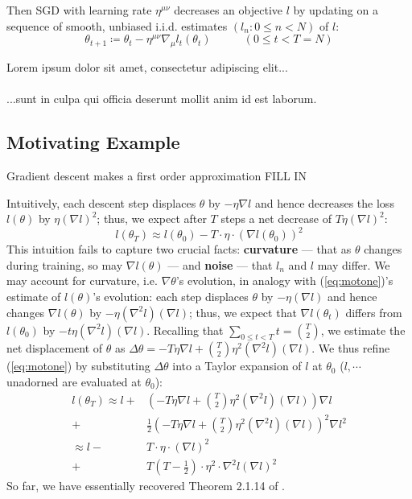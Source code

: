 \documentclass{article}
\newcommand{\wrap}[1]{\left( #1 \right)}
\newcommand{\lorem}[1]{
    Lorem ipsum dolor sit amet, consectetur adipiscing elit...\\
    \nopagebreak\vspace{#1cm} \ \\
    ...sunt in culpa qui officia deserunt mollit anim id est laborum.
}
\begin{document}
    Then SGD with learning rate $\eta^{\mu\nu}$ decreases an objective $l$ by
    updating on a sequence of smooth, unbiased i.i.d.  estimates $(l_n: 0\leq
    n<N)$ of $l$:
    \begin{equation}\label{eq:sgdstep} \theta_{t+1} \coloneqq \theta_t -
        \eta^{\mu\nu} \nabla_\mu l_t(\theta_t)~~~~~~~~~~~~~(0\leq t<T=N)
    \end{equation}

    \lorem{5}

\subsection*{Motivating Example}
    Gradient descent makes a first order approximation
    {\color{red} FILL IN}

    Intuitively, each descent step displaces $\theta$ by $-\eta \nabla l$ and
    hence decreases the loss $l(\theta)$ by $\eta (\nabla l)^2$; thus, we
    expect after $T$ steps a net decrease of $T \eta (\nabla l)^2$:
    \begin{equation} \label{eq:motone}
        l(\theta_T) \approx l(\theta_0) - T \cdot \eta \cdot (\nabla l(\theta_0))^2
    \end{equation}
    This intuition fails to capture two crucial facts: {\bf curvature} --- that
    as $\theta$ changes during training, so may $\nabla l(\theta)$ --- and {\bf
    noise} --- that $l_n$ and $l$ may differ.
    We may account for curvature, i.e. $\nabla \theta$'s evolution, in analogy
    with (\ref{eq:motone})'s estimate of $l(\theta)$'s evolution: each step
    displaces $\theta$ by $-\eta(\nabla l)$ and hence changes $\nabla
    l(\theta)$ by $-\eta (\nabla^2 l) (\nabla l)$; thus, we expect that $\nabla
    l(\theta_t)$ differs from $l(\theta_0)$ by $-t \eta (\nabla^2 l) (\nabla
    l)$.  Recalling that $\sum_{0\leq t<T} t = {T \choose 2}$, we estimate the
    net displacement of $\theta$ as $\Delta \theta = -T \eta \nabla l + {T
    \choose 2} \eta^2 (\nabla^2 l) (\nabla l)$.  We thus refine
    (\ref{eq:motone}) by substituting $\Delta \theta$ into a Taylor expansion
    of $l$ at $\theta_0$ ($l, \cdots$ unadorned are evaluated at $\theta_0$):
    \begin{align} \label{eq:mottwo}
        l(\theta_T)
        \approx l +& \wrap{-T \eta \nabla l + {T \choose 2} \eta^2 (\nabla^2 l) (\nabla l)} \nabla l \\
                  +& \frac{1}{2} \wrap{-T \eta \nabla l + {T \choose 2} \eta^2 (\nabla^2 l) (\nabla l)}^2 \nabla l^2 \\
        \approx l -& T \cdot \eta \cdot \wrap{\nabla l}^2 \\
                  +& T \wrap{T-\frac{1}{2}} \cdot \eta^2 \cdot \nabla^2 l (\nabla l)^2
    \end{align}
    So far, we have essentially recovered Theorem 2.1.14 of \citet{ne04}.
    
\end{document}
